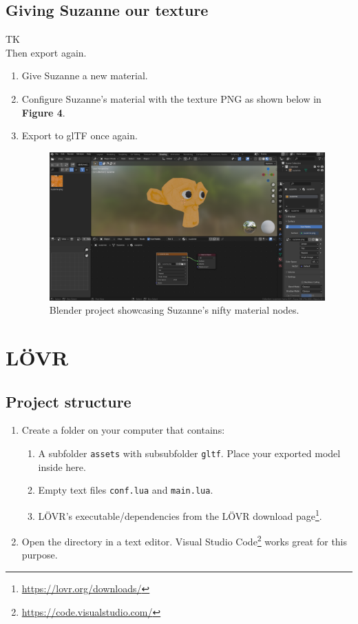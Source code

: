 \documentclass[12pt, letterpaper]{article}
\begin{document}
\subsection{Giving Suzanne our texture}
TK\\
Then export again.
\begin{enumerate}
    \item Give Suzanne a new material.
    \item Configure Suzanne's material with the texture PNG as shown below in \textbf{Figure 4}.
    \item Export to glTF once again.
          \begin{figure}[H]
              \includegraphics[scale=0.4]{assets/img/blender-material.png}
              \caption{Blender project showcasing Suzanne's nifty material nodes.}
          \end{figure}
\end{enumerate}

\section{L{\"O}VR}

\subsection{Project structure}
\begin{enumerate}
    \item Create a folder on your computer that contains:
          \begin{enumerate}
              \item A subfolder \verb|assets| with subsubfolder \verb|gltf|. Place your exported model inside here.
              \item Empty text files \verb|conf.lua| and \verb|main.lua|.
              \item L{\"O}VR's executable/dependencies from the L{\"O}VR download page\footnote{\url{https://lovr.org/downloads/}}.
          \end{enumerate}
    \item Open the directory in a text editor. Visual Studio Code\footnote{\url{https://code.visualstudio.com/}} works great for this purpose.
\end{enumerate}
\end{document}
